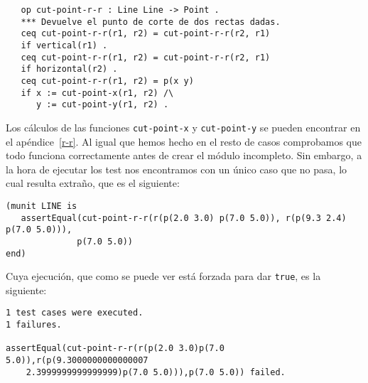 {\codesize
\begin{verbatim}	
   op cut-point-r-r : Line Line -> Point .
   *** Devuelve el punto de corte de dos rectas dadas.
   ceq cut-point-r-r(r1, r2) = cut-point-r-r(r2, r1)
   if vertical(r1) .
   ceq cut-point-r-r(r1, r2) = cut-point-r-r(r2, r1)
   if horizontal(r2) .
   ceq cut-point-r-r(r1, r2) = p(x y)
   if x := cut-point-x(r1, r2) /\
      y := cut-point-y(r1, r2) .

\end{verbatim}
}

Los cálculos de las funciones \texttt{cut-point-x} y \texttt{cut-point-y} se pueden encontrar en el apéndice~\ref{r-r}. Al igual que hemos hecho en el resto de casos comprobamos que todo funciona correctamente antes de crear el módulo incompleto. Sin embargo, a la hora de ejecutar los test nos encontramos con un único caso que no pasa, lo cual resulta extraño, que es el siguiente: \par

{\codesize
\begin{verbatim}
(munit LINE is
   assertEqual(cut-point-r-r(r(p(2.0 3.0) p(7.0 5.0)), r(p(9.3 2.4) p(7.0 5.0))),
              p(7.0 5.0))
end)
\end{verbatim}
}

Cuya ejecución, que como se puede ver está forzada para dar \texttt{true}, es la siguiente:\par

{\codesize
\begin{verbatim}
1 test cases were executed.
1 failures.

assertEqual(cut-point-r-r(r(p(2.0 3.0)p(7.0 5.0)),r(p(9.3000000000000007
    2.3999999999999999)p(7.0 5.0))),p(7.0 5.0)) failed.
\end{verbatim}
}

